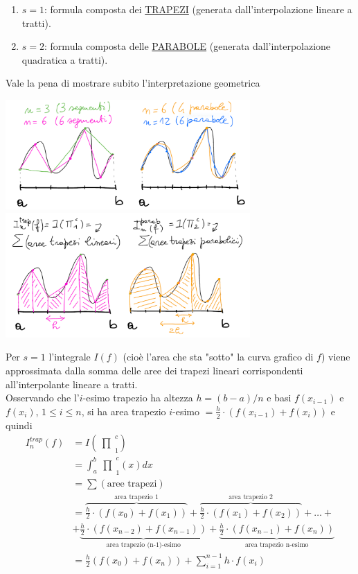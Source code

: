 \documentclass[12pt,a4paper]{article}
\newcommand{\inter}{\begin{matrix}\prod\end{matrix}}
\begin{document}
\begin{enumerate}
    \item $s=1$: formula composta dei \underline{TRAPEZI} (generata dall'interpolazione lineare a tratti).
    \item $s=2$: formula composta delle \underline{PARABOLE} (generata dall'interpolazione quadratica a tratti).
\end{enumerate}
Vale la pena di mostrare subito l'interpretazione geometrica
\begin{center}
    \includegraphics[width=0.7\textwidth]{pag17.png}
    \includegraphics[width=0.7\textwidth]{pag18.png}
\end{center}
Per $s=1$ l'integrale $I(f)$ (cioè l'area che sta "sotto" la curva grafico di $f$) viene approssimata dalla somma delle aree dei trapezi lineari corrispondenti all'interpolante lineare a tratti.\\
Osservando che l'$i$-esimo trapezio ha altezza $h=(b-a)/n$ e basi $f(x_{i-1})$ e $f(x_i)$, $1 \leq i \leq n$, si ha area trapezio $i$-esimo $= \frac{h}{2} \cdot (f(x_{i-1}) + f(x_i))$ e quindi
\[
\begin{split}
    I_n^{trap} (f) & = I(\inter_1^c) \\
    & = \int_a^b \inter_1^c (x) dx \\
    & = \sum (\text{aree trapezi}) \\
    & = \overbrace{\frac{h}{2} \cdot (f(x_0) + f(x_1))}^{\text{area trapezio 1}} + \overbrace{\frac{h}{2} \cdot (f(x_1) + f(x_2))}^{\text{area trapezio 2}} + \dotso + \\
    & + \underbrace{\frac{h}{2} \cdot (f(x_{n-2}) + f(x_{n-1}))}_{\text{area trapezio (n-1)-esimo}} + \underbrace{\frac{h}{2} \cdot (f(x_{n-1}) + f(x_n))}_{\text{area trapezio n-esimo}} \\ 
    & =\frac{h}{2} (f(x_0) + f(x_n)) + \sum_{i=1}^{n-1} h \cdot f(x_i)
\end{split}
\]
\end{document}
